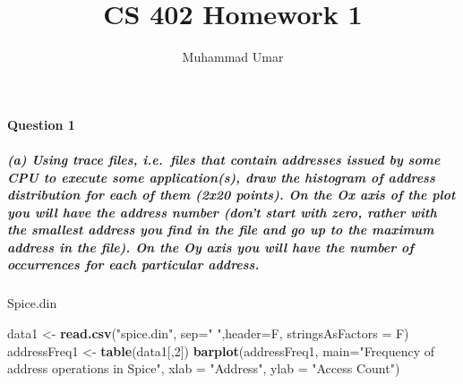 \documentclass[
]{article}
\title{CS 402 Homework 1}
\author{Muhammad Umar}
\date{}
\newenvironment{Shaded}{\begin{snugshade}}{\end{snugshade}}
\newcommand{\DataTypeTok}[1]{\textcolor[rgb]{0.13,0.29,0.53}{#1}}
\newcommand{\DecValTok}[1]{\textcolor[rgb]{0.00,0.00,0.81}{#1}}
\newcommand{\KeywordTok}[1]{\textcolor[rgb]{0.13,0.29,0.53}{\textbf{#1}}}
\newcommand{\NormalTok}[1]{#1}
\newcommand{\StringTok}[1]{\textcolor[rgb]{0.31,0.60,0.02}{#1}}
\begin{document}
\maketitle

\hypertarget{question-1}{%
\paragraph{Question 1}\label{question-1}}

\hypertarget{a-using-trace-files-i.e.-files-that-contain-addresses-issued-by-some-cpu-to-execute-some-applications-draw-the-histogram-of-address-distribution-for-each-of-them-2x20-points.-on-the-ox-axis-of-the-plot-you-will-have-the-address-number-dont-start-with-zero-rather-with-the-smallest-address-you-find-in-the-file-and-go-up-to-the-maximum-address-in-the-file.-on-the-oy-axis-you-will-have-the-number-of-occurrences-for-each-particular-address.}{%
\subparagraph{(a) Using trace files, i.e.~files that contain addresses
issued by some CPU to execute some application(s), draw the histogram of
address distribution for each of them (2x20 points). On the Ox axis of
the plot you will have the address number (don't start with zero, rather
with the smallest address you find in the file and go up to the maximum
address in the file). On the Oy axis you will have the number of
occurrences for each particular
address.}\label{a-using-trace-files-i.e.-files-that-contain-addresses-issued-by-some-cpu-to-execute-some-applications-draw-the-histogram-of-address-distribution-for-each-of-them-2x20-points.-on-the-ox-axis-of-the-plot-you-will-have-the-address-number-dont-start-with-zero-rather-with-the-smallest-address-you-find-in-the-file-and-go-up-to-the-maximum-address-in-the-file.-on-the-oy-axis-you-will-have-the-number-of-occurrences-for-each-particular-address.}}

Spice.din

\begin{Shaded}
\begin{Highlighting}[]
\NormalTok{data1 <-}\StringTok{ }\KeywordTok{read.csv}\NormalTok{(}\StringTok{"spice.din"}\NormalTok{, }\DataTypeTok{sep=}\StringTok{" "}\NormalTok{,}\DataTypeTok{header=}\NormalTok{F, }\DataTypeTok{stringsAsFactors =}\NormalTok{ F)}
\NormalTok{addressFreq1 <-}\StringTok{ }\KeywordTok{table}\NormalTok{(data1[,}\DecValTok{2}\NormalTok{])}
\KeywordTok{barplot}\NormalTok{(addressFreq1, }\DataTypeTok{main=}\StringTok{"Frequency of address operations in Spice"}\NormalTok{, }
        \DataTypeTok{xlab =} \StringTok{"Address"}\NormalTok{, }\DataTypeTok{ylab =} \StringTok{"Access Count"}\NormalTok{)}
\end{Highlighting}
\end{Shaded}
\end{document}
